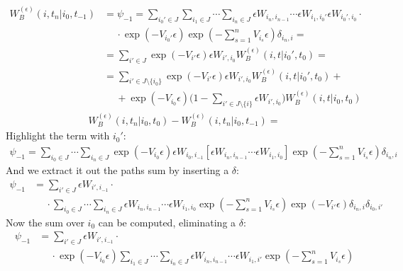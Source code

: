 \documentclass[../template.tex]{subfiles}
\begin{document}
\begin{exo}
    \begin{align*}
        W_B^{(\epsilon)}(i,t_n|i_0,t_{-1}) &= \psi_{-1} = \sum_{i_0' \in J} \sum_{i_1 \in J} \cdots \sum_{i_n \in J} \epsilon W_{i_n, i_{n-1}} \cdots \epsilon W_{i_1,i_0'}\epsilon W_{i_0', i_0} \cdot \\
        &\quad \>\cdot \exp(-V_{i_0'}\epsilon)\exp\left(-\sum_{s=1}^n V_{i_s} \epsilon\right) \delta_{i_n,i} = \\
        &= \sum_{i' \in J} \exp(-V_{i'}\epsilon) \epsilon W_{i',i_0} W_B^{(\epsilon)}(i,t|i_0',t_0) =\\
        &= \sum_{i' \in J\setminus \{i_0\}} \exp(-V_{i'}\epsilon) \epsilon W_{i',i_0} W_B^{(\epsilon)}(i,t|i_0',t_0) + \\
        &\quad \> + \exp(-V_{i_0}\epsilon)\Big(1-\sum_{i' \in J\setminus \{i\}} \epsilon W_{i',i_0}\Big) W_B^{(\epsilon)}(i,t|i_0,t_0)
    \end{align*}   
    \begin{align*}
        W_B^{(\epsilon)}(i,t_n|i_0,t_0) - W_B^{(\epsilon)}(i,t_n|i_0,t_{-1}) = 
    \end{align*}
    Highlight the term with $i_0'$:
    \begin{align*}
        \psi_{-1} = \sum_{i_0 \in J} \cdots \sum_{i_n \in J} \exp(-V_{i_0} \epsilon) \epsilon W_{i_0,i_{-1}} \left[\epsilon W_{i_n, i_{n-1}} \cdots \epsilon W_{i_1,i_0}\right] \exp\left(-\sum_{s=1}^n V_{i_s} \epsilon\right) \delta_{i_n,i}
    \end{align*}
    And we extract it out the paths sum by inserting a $\delta$:
    \begin{align*}
        \psi_{-1} &= \sum_{i' \in J} \epsilon W_{i',i_{-1}} \cdot \\
        &\quad \> \cdot \sum_{i_0 \in J} \cdots \sum_{i_n \in J} \epsilon W_{i_n, i_{n-1}} \cdots \epsilon W_{i_1,i_0} \exp\left(-\sum_{s=1}^n V_{i_s} \epsilon\right) \exp(-V_{i'} \epsilon) \delta_{i_n,i} \delta_{i_0,i'}
    \end{align*}
    Now the sum over $i_0$ can be computed, eliminating a $\delta$:
    \begin{align*}
        \psi_{-1} &= \sum_{i' \in J} \epsilon W_{i',i_{-1}} \cdot \\
        &\quad \> \cdot \exp(-V_{i_0}\epsilon)\sum_{i_1 \in J}\cdots \sum_{i_n \in J} \epsilon W_{i_n, i_{n-1}}\cdots \epsilon W_{i_1, i'} \exp\left(-\sum_{s=1}^n V_{i_s} \epsilon\right)
    \end{align*}

\end{exo}
\end{document}
